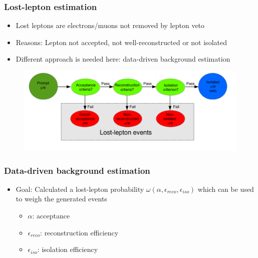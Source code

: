 


\begin{frame}
  \frametitle{Lost-lepton estimation}
  \begin{itemize}
    \item Lost leptons are electrons/muons not removed by lepton veto
    \item Reasons: Lepton not accepted, not well-reconstructed or not isolated
    \item Different approach is needed here: data-driven background estimation
  \end{itemize}

\begin{figure}[H]
	\centering
	 \includegraphics[width=\textwidth]{figures/lost-lepton.png}
\end{figure}

\end{frame}

\begin{frame}
  \frametitle{Data-driven background estimation}
  \begin{itemize}
    \item Goal: Calculated a lost-lepton probability $\omega(\alpha, \epsilon_{reco}, \epsilon_{iso})$ which can be used to weigh the generated events
    \begin{itemize}
      \item $\alpha$: acceptance
      \item $\epsilon_{reco}$: reconstruction efficiency
      \item $\epsilon_{iso}$: isolation efficiency
    \end{itemize}
  \end{itemize}

\end{frame}
